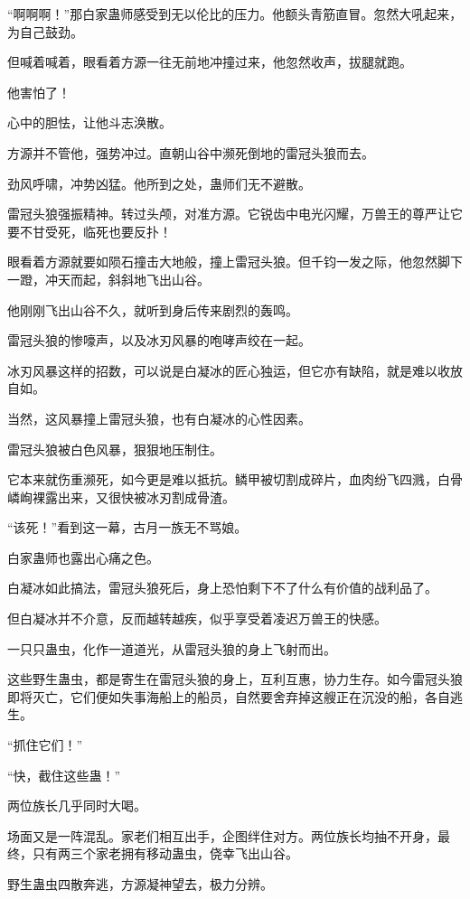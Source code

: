 \begin{this_body}
“啊啊啊！”那白家蛊师感受到无以伦比的压力。他额头青筋直冒。忽然大吼起来，为自己鼓劲。

但喊着喊着，眼看着方源一往无前地冲撞过来，他忽然收声，拔腿就跑。

他害怕了！

心中的胆怯，让他斗志涣散。

方源并不管他，强势冲过。直朝山谷中濒死倒地的雷冠头狼而去。

劲风呼啸，冲势凶猛。他所到之处，蛊师们无不避散。

雷冠头狼强振精神。转过头颅，对准方源。它锐齿中电光闪耀，万兽王的尊严让它要不甘受死，临死也要反扑！

眼看着方源就要如陨石撞击大地般，撞上雷冠头狼。但千钧一发之际，他忽然脚下一蹬，冲天而起，斜斜地飞出山谷。

他刚刚飞出山谷不久，就听到身后传来剧烈的轰鸣。

雷冠头狼的惨嚎声，以及冰刃风暴的咆哮声绞在一起。

冰刃风暴这样的招数，可以说是白凝冰的匠心独运，但它亦有缺陷，就是难以收放自如。

当然，这风暴撞上雷冠头狼，也有白凝冰的心性因素。

雷冠头狼被白色风暴，狠狠地压制住。

它本来就伤重濒死，如今更是难以抵抗。鳞甲被切割成碎片，血肉纷飞四溅，白骨嶙峋裸露出来，又很快被冰刃割成骨渣。

“该死！”看到这一幕，古月一族无不骂娘。

白家蛊师也露出心痛之色。

白凝冰如此搞法，雷冠头狼死后，身上恐怕剩下不了什么有价值的战利品了。

但白凝冰并不介意，反而越转越疾，似乎享受着凌迟万兽王的快感。

一只只蛊虫，化作一道道光，从雷冠头狼的身上飞射而出。

这些野生蛊虫，都是寄生在雷冠头狼的身上，互利互惠，协力生存。如今雷冠头狼即将灭亡，它们便如失事海船上的船员，自然要舍弃掉这艘正在沉没的船，各自逃生。

“抓住它们！”

“快，截住这些蛊！”

两位族长几乎同时大喝。

场面又是一阵混乱。家老们相互出手，企图绊住对方。两位族长均抽不开身，最终，只有两三个家老拥有移动蛊虫，侥幸飞出山谷。

野生蛊虫四散奔逃，方源凝神望去，极力分辨。


\end{this_body}
